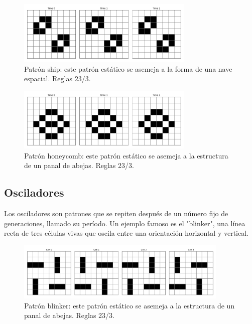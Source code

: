 \documentclass[]{article}
\begin{document}
\begin{figure}[H]
  \centering
  \includegraphics[width=0.75\textwidth]{../assets/still_life/ship/ship.png}
  \caption{Patrón ship: este patrón estático se asemeja a la forma de una nave espacial. Reglas 23/3.}
  \label{fig:ship}
  \end{figure}

\begin{figure}[H]
  \centering
  \includegraphics[width=0.75\textwidth]{../assets/still_life/honeycomb/honeycomb.png}
  \caption{Patrón honeycomb: este patrón estático se asemeja a la estructura de un panal de abejas. Reglas 23/3.}
  \label{fig:honeycomb}
  \end{figure}


\subsection{Osciladores}
Los osciladores son patrones que se repiten después de un número fijo de generaciones, llamado su período. Un ejemplo famoso es el "blinker", una línea recta de tres células vivas que oscila entre una orientación horizontal y vertical.


\begin{figure}[H]
  \centering
  \includegraphics[width=0.9\textwidth]{../assets/oscillator/blinker/blinker.png}
  \caption{Patrón blinker: este patrón estático se asemeja a la estructura de un panal de abejas. Reglas 23/3.}
  \label{fig:blinker}
  \end{figure}
\end{document}
